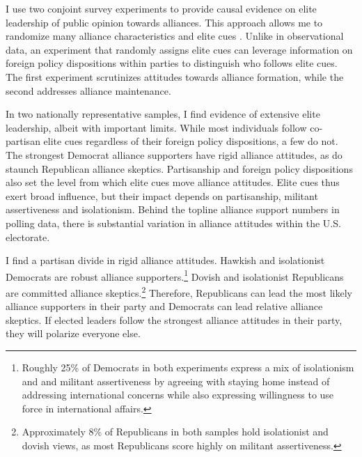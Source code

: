 \documentclass[12pt]{article}
\begin{document}
I use two conjoint survey experiments to provide causal evidence on elite leadership of public opinion towards alliances.
This approach allows me to randomize many alliance characteristics and elite cues \citep{Hainmuelleretal2014}.
Unlike in observational data, an experiment that randomly assigns elite cues can leverage information on foreign policy dispositions within parties to distinguish who follows elite cues. 
The first experiment scrutinizes attitudes towards alliance formation, while the second addresses alliance maintenance. 


In two nationally representative samples, I find evidence of extensive elite leadership, albeit with important limits.
While most individuals follow co-partisan elite cues regardless of their foreign policy dispositions, a few do not.
The strongest Democrat alliance supporters have rigid alliance attitudes, as do staunch Republican alliance skeptics. 
Partisanship and foreign policy dispositions also set the level from which elite cues move alliance attitudes.
Elite cues thus exert broad influence, but their impact depends on partisanship, militant assertiveness and isolationism.
Behind the topline alliance support numbers in polling data, there is substantial variation in alliance attitudes within the U.S. electorate.


I find a partisan divide in rigid alliance attitudes.
Hawkish and isolationist Democrats are robust alliance supporters.\footnote{Roughly 25\% of Democrats in both experiments express a mix of isolationism and and militant assertiveness by agreeing with staying home instead of addressing international concerns while also expressing willingness to use force in international affairs.}
Dovish and isolationist Republicans are committed alliance skeptics.\footnote{Approximately 8\% of Republicans in both samples hold isolationist and dovish views, as most Republicans score highly on militant assertiveness.} 
Therefore, Republicans can lead the most likely alliance supporters in their party and Democrats can lead relative alliance skeptics. 
If elected leaders follow the strongest alliance attitudes in their party, they will polarize everyone else. 


\end{document}

